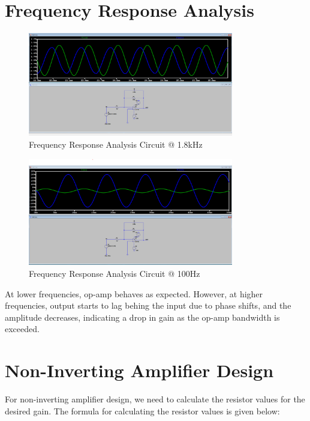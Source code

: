 \newpage{}
\thispagestyle{plain}

\section{Frequency Response Analysis}

\begin{figure}[h]
    \centering
    \includegraphics[width=0.8\textwidth]{assets/p2-1.8k.png}
    \caption{Frequency Response Analysis Circuit @ 1.8kHz}
    \label{fig:frequency-response-analysis-circuit-1.8k}
\end{figure}

\begin{figure}[h]
    \centering
    \includegraphics[width=0.8\textwidth]{assets/p2-100.png}
    \caption{Frequency Response Analysis Circuit @ 100Hz}
    \label{fig:frequency-response-analysis-circuit-100}
\end{figure}

At lower frequencies, op-amp behaves as expected. However, at higher frequencies, output starts to lag behing the input due to phase shifts, and the amplitude decreases, indicating a drop in gain as the op-amp bandwidth is exceeded.

\newpage{}
\thispagestyle{plain}

\section{Non-Inverting Amplifier Design}
For non-inverting amplifier design, we need to calculate the resistor values for the desired gain. The formula for calculating the resistor values is given below:

